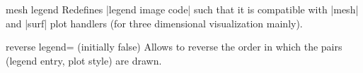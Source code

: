 \begin{pgfplotskey}{mesh legend}
	Redefines |legend image code| such that it is compatible with |mesh| and |surf| plot handlers (for three dimensional visualization mainly).
\pgfplotsexpensiveexample
\begin{codeexample}[]
\end{codeexample}
\end{pgfplotskey}

\begin{pgfplotskey}{reverse legend= (initially false)}
	Allows to reverse the order in which the pairs (legend entry, plot style) are drawn.
\begin{codeexample}[]
\end{codeexample}
\end{pgfplotskey}


